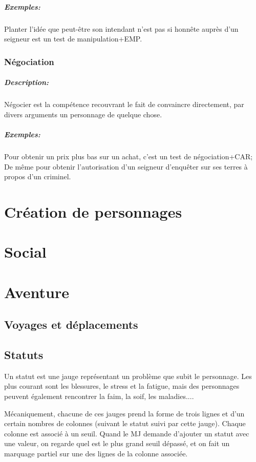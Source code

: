 \documentclass[10pt,a4paper,twocolumn]{book}
\begin{document}
\paragraph{Exemples:}Planter l'idée que peut-être son intendant n'est pas si honnête auprès d'un seigneur est un test de manipulation+EMP.
\subsection{Négociation}
\paragraph{Description:}Négocier est la compétence recouvrant le fait de convaincre directement, par divers arguments un personnage de quelque chose.
\paragraph{Exemples:}Pour obtenir un prix plus bas sur un achat, c'est un test de négociation+CAR; De même pour obtenir l'autorisation d'un seigneur d'enquêter sur ses terres à propos d'un criminel.
\chapter{Création de personnages}

\chapter{Social}
\chapter{Aventure}
\section{Voyages et déplacements}
\section{Statuts}
Un statut est une jauge représentant un problème que subit le personnage. Les plus courant sont les blessures, le stress et la fatigue, mais des personnages peuvent également rencontrer la faim, la soif, les maladies....

Mécaniquement, chacune de ces jauges prend la forme de trois lignes et d'un certain nombres de colonnes (suivant le statut suivi par cette jauge). Chaque colonne est associé à un seuil. Quand le MJ demande d'ajouter un statut avec une valeur, on regarde quel est le plus grand seuil dépassé, et on fait un marquage partiel sur une des lignes de la colonne associée. 
\end{document}
